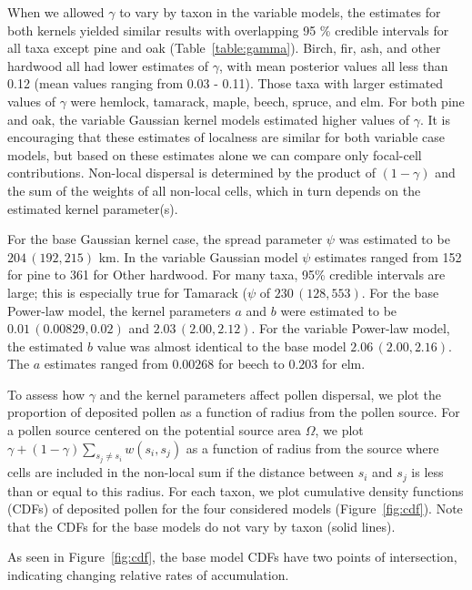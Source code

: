 \documentclass[12pt]{article}
\begin{document}
When we allowed $\gamma$ to vary by taxon in the variable models, the
estimates for both kernels yielded similar results with overlapping 95
\% credible intervals for all taxa except pine and oak
(Table~\ref{table:gamma}). Birch, fir, ash, and other
hardwood all had lower estimates of $\gamma$, with mean posterior
values all less than 0.12 (mean values ranging from 0.03 -
0.11). Those taxa with larger estimated values of $\gamma$ were
hemlock, tamarack, maple, beech, spruce, and elm. For both pine and
oak, the variable Gaussian kernel models estimated higher values of
$\gamma$. It is encouraging that these estimates of localness are
similar for both variable case models, but based on these estimates
alone we can compare only focal-cell contributions. Non-local
dispersal is determined by the product of $(1-\gamma)$ and the sum of
the weights of all non-local cells, which in turn depends on the
estimated kernel parameter(s).

For the base Gaussian kernel case, the spread parameter $\psi$ was
estimated to be $204\,(192, 215)$ km. In the variable Gaussian model
$\psi$ estimates ranged from 152 for pine to 361 for Other
hardwood. For many taxa, 95\% credible intervals are large; this is
especially true for Tamarack ($\psi$ of $230\,(128, 553)$. For the
base Power-law model, the kernel parameters $a$ and $b$ were estimated
to be $0.01\,(0.00829, 0.02)$ and $2.03\,(2.00, 2.12)$. For the
variable Power-law model, the estimated $b$ value was almost identical
to the base model $2.06\,(2.00, 2.16)$. The $a$ estimates ranged from
$0.00268$ for beech to $0.203$ for elm.

To assess how $\gamma$ and the kernel parameters affect pollen
dispersal, we plot the proportion of deposited pollen as a function of
radius from the pollen source. For a pollen source centered on the
potential source area $\Omega$, we plot $\gamma + (1- \gamma)
\sum_{s_j \neq s_i} w(s_i, s_j)$ as a function of radius from the
source where cells are included in the non-local sum if the distance
between $s_i$ and $s_j$ is less than or equal to this radius. For each
taxon, we plot cumulative density functions (CDFs) of deposited pollen
for the four considered models (Figure~\ref{fig:cdf}). Note that the
CDFs for the base models do not vary by taxon (solid lines).  

As seen in Figure~\ref{fig:cdf}, the base model CDFs have two points
of intersection, indicating changing relative rates of accumulation.
\end{document}
